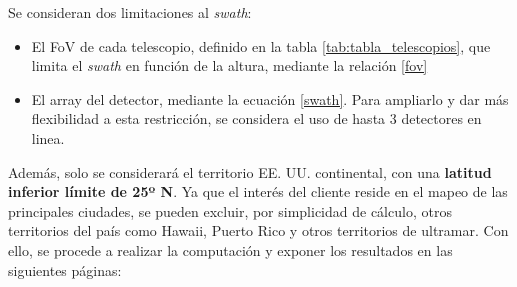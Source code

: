 Se consideran dos limitaciones al \textit{swath}:
\begin{itemize}
    \item El FoV de cada telescopio, definido en la tabla \ref{tab:tabla_telescopios}, que limita el \textit{swath} en función de la altura, mediante la relación \ref{fov}
    \item El array del detector, mediante la ecuación \ref{swath}. Para ampliarlo y dar más flexibilidad a esta restricción, se considera el uso de hasta 3 detectores en linea.
\end{itemize}

Además, solo se considerará el territorio EE. UU. continental, con una \textbf{latitud inferior límite de 25º N}. Ya que el interés del cliente reside en el mapeo de las principales ciudades, se pueden excluir, por simplicidad de cálculo, otros territorios del país como Hawaii, Puerto Rico y otros territorios de ultramar. Con ello, se procede a realizar la computación y exponer los resultados en las siguientes páginas:

